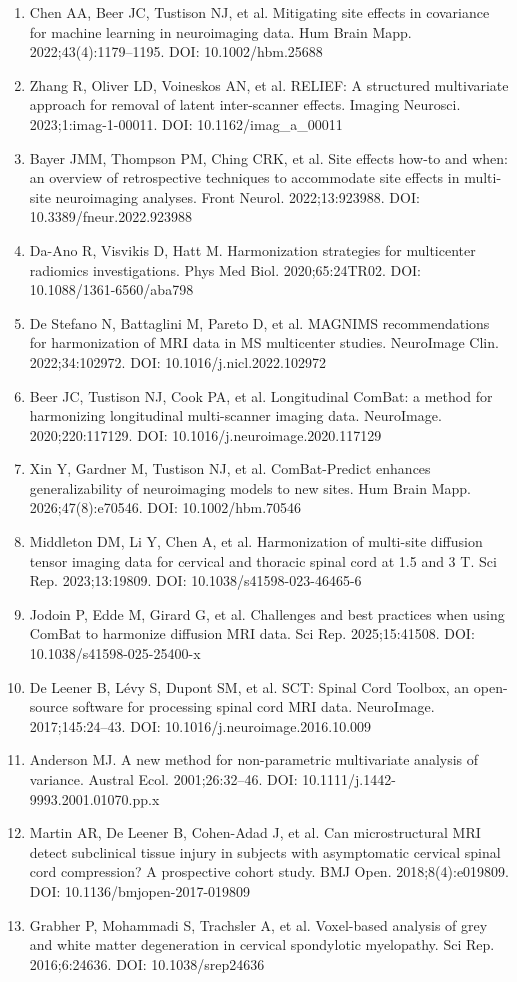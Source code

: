 \documentclass[12pt,a4paper]{article}
\begin{document}
\begin{enumerate}[nosep,leftmargin=*]
\item Chen AA, Beer JC, Tustison NJ, et al. Mitigating site effects in covariance for machine learning in neuroimaging data. Hum Brain Mapp. 2022;43(4):1179--1195. DOI: 10.1002/hbm.25688
\item Zhang R, Oliver LD, Voineskos AN, et al. RELIEF: A structured multivariate approach for removal of latent inter-scanner effects. Imaging Neurosci. 2023;1:imag-1-00011. DOI: 10.1162/imag\_a\_00011
\item Bayer JMM, Thompson PM, Ching CRK, et al. Site effects how-to and when: an overview of retrospective techniques to accommodate site effects in multi-site neuroimaging analyses. Front Neurol. 2022;13:923988. DOI: 10.3389/fneur.2022.923988
\item Da-Ano R, Visvikis D, Hatt M. Harmonization strategies for multicenter radiomics investigations. Phys Med Biol. 2020;65:24TR02. DOI: 10.1088/1361-6560/aba798
\item De Stefano N, Battaglini M, Pareto D, et al. MAGNIMS recommendations for harmonization of MRI data in MS multicenter studies. NeuroImage Clin. 2022;34:102972. DOI: 10.1016/j.nicl.2022.102972
\item Beer JC, Tustison NJ, Cook PA, et al. Longitudinal ComBat: a method for harmonizing longitudinal multi-scanner imaging data. NeuroImage. 2020;220:117129. DOI: 10.1016/j.neuroimage.2020.117129
\item Xin Y, Gardner M, Tustison NJ, et al. ComBat-Predict enhances generalizability of neuroimaging models to new sites. Hum Brain Mapp. 2026;47(8):e70546. DOI: 10.1002/hbm.70546
\item Middleton DM, Li Y, Chen A, et al. Harmonization of multi-site diffusion tensor imaging data for cervical and thoracic spinal cord at 1.5 and 3 T. Sci Rep. 2023;13:19809. DOI: 10.1038/s41598-023-46465-6
\item Jodoin P, Edde M, Girard G, et al. Challenges and best practices when using ComBat to harmonize diffusion MRI data. Sci Rep. 2025;15:41508. DOI: 10.1038/s41598-025-25400-x
\item De Leener B, Lévy S, Dupont SM, et al. SCT: Spinal Cord Toolbox, an open-source software for processing spinal cord MRI data. NeuroImage. 2017;145:24--43. DOI: 10.1016/j.neuroimage.2016.10.009
\item Anderson MJ. A new method for non-parametric multivariate analysis of variance. Austral Ecol. 2001;26:32--46. DOI: 10.1111/j.1442-9993.2001.01070.pp.x
\item Martin AR, De Leener B, Cohen-Adad J, et al. Can microstructural MRI detect subclinical tissue injury in subjects with asymptomatic cervical spinal cord compression? A prospective cohort study. BMJ Open. 2018;8(4):e019809. DOI: 10.1136/bmjopen-2017-019809
\item Grabher P, Mohammadi S, Trachsler A, et al. Voxel-based analysis of grey and white matter degeneration in cervical spondylotic myelopathy. Sci Rep. 2016;6:24636. DOI: 10.1038/srep24636
\end{enumerate}
\end{document}
